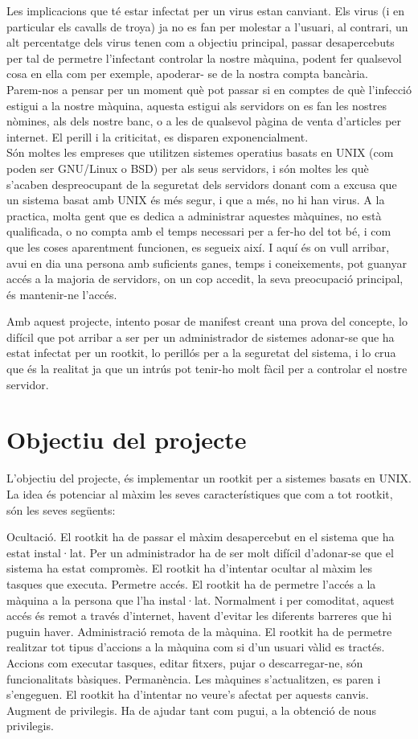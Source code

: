 \documentclass[a4paper]{article}
\begin{document}
Les implicacions que té estar infectat per un virus estan canviant. Els virus (i en particular
els cavalls de troya) ja no es fan per molestar a l'usuari, al contrari, un alt percentatge dels
virus tenen com a objectiu principal, passar desapercebuts per tal de permetre l'infectant
controlar la nostre màquina, podent fer qualsevol cosa en ella com per exemple, apoderar-
se de la nostra compta bancària.\\
Parem-nos a pensar per un moment què pot passar si en comptes de què l'infecció estigui
a la nostre màquina, aquesta estigui als servidors on es fan les nostres nòmines, als dels
nostre banc, o a les de qualsevol pàgina de venta d'articles per internet. El perill i la
criticitat, es disparen exponencialment.\\
Són moltes les empreses que utilitzen sistemes operatius basats en UNIX (com poden ser
GNU/Linux o BSD) per als seus servidors, i són moltes les què s'acaben despreocupant
de la seguretat dels servidors donant com a excusa que un sistema basat amb UNIX és
més segur, i que a més, no hi han virus. A la practica, molta gent que es dedica a
administrar aquestes màquines, no està qualificada, o no compta amb el temps necessari
per a fer-ho del tot bé, i com que les coses aparentment funcionen, es segueix així.
I aquí és on vull arribar, avui en dia una persona amb suficients ganes, temps i
coneixements, pot guanyar accés a la majoria de servidors, on un cop accedit, la seva
preocupació principal, és mantenir-ne l'accés.


Amb aquest projecte, intento posar de manifest creant una prova del concepte, lo difícil
que pot arribar a ser per un administrador de sistemes adonar-se que ha estat infectat per
un rootkit, lo perillós per a la seguretat del sistema, i lo crua que és la realitat ja que un
intrús pot tenir-ho molt fàcil per a controlar el nostre servidor.

\section{Objectiu del projecte}

L'objectiu del projecte, és implementar un rootkit per a sistemes basats en UNIX. La idea
és potenciar al màxim les seves característiques que com a tot rootkit, són les seves
següents:

Ocultació. El rootkit ha de passar el màxim desapercebut en el sistema que ha
estat instal·lat. Per un administrador ha de ser molt difícil d'adonar-se que el
sistema ha estat compromès. El rootkit ha d'intentar ocultar al màxim les tasques
que executa.
Permetre accés. El rootkit ha de permetre l'accés a la màquina a la persona que
l'ha instal·lat. Normalment i per comoditat, aquest accés és remot a través
d'internet, havent d'evitar les diferents barreres que hi puguin haver.
Administració remota de la màquina. El rootkit ha de permetre realitzar tot tipus
d'accions a la màquina com si d'un usuari vàlid es tractés. Accions com executar
tasques, editar fitxers, pujar o descarregar-ne, són funcionalitats bàsiques.
Permanència. Les màquines s'actualitzen, es paren i s'engeguen. El rootkit ha
d'intentar no veure's afectat per aquests canvis.
Augment de privilegis. Ha de ajudar tant com pugui, a la obtenció de nous
privilegis.
\end{document}
